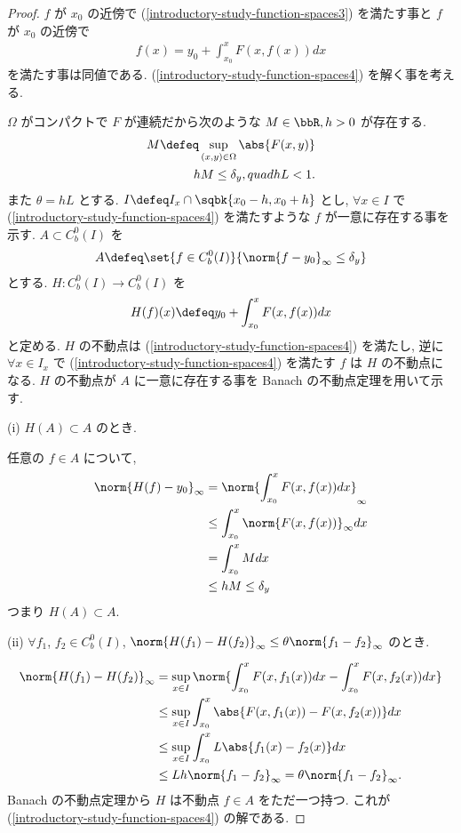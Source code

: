 \documentclass[openany, a4paper, oneside]{jsbook}
\begin{document}
\begin{proof}
$f$ が $x_0$ の近傍で (\ref{introductory-study-function-spaces3}) を満たす事と $f$ が $x_0$ の近傍で
\begin{align}
 f(x)
 =
 y_0 + \int_{x_0}^{x} F(x, f(x)) dx \label{introductory-study-function-spaces4}
\end{align}
を満たす事は同値である.
(\ref{introductory-study-function-spaces4}) を解く事を考える.

$\Omega$ がコンパクトで $F$ が連続だから次のような $M \in \bbR, h > 0$ が存在する.
\begin{align*}
 M
 \defeq
 \sup_{(x, y) \in \Omega} \abs{F(x, y)} \\
 hM
 \leq
 \delta_y, quad hL < 1.
\end{align*}
また $\theta=hL$ とする.
$I \defeq I_x \cap \sqbk{x_0 - h, x_0 + h}$ とし,
$\forall x \in I$ で (\ref{introductory-study-function-spaces4}) を満たすような $f$ が一意に存在する事を示す.
$A \subset C^0_b(I)$ を
\begin{align*}
 A
 \defeq
 \set{f \in C^0_b(I)}{\norm{f - y_0}_{\infty} \leq \delta_y}
\end{align*}
とする.
$H \colon C^0_b(I) \to C^0_b(I)$ を
\begin{align*}
 H(f)(x)
 \defeq
 y_0 + \int_{x_0}^{x} F(x, f(x)) dx
\end{align*}
と定める.
$H$ の不動点は (\ref{introductory-study-function-spaces4}) を満たし,
逆に $\forall x \in I_x$ で (\ref{introductory-study-function-spaces4}) を満たす $f$ は $H$ の不動点になる.
$H$ の不動点が $A$ に一意に存在する事を Banach の不動点定理を用いて示す.

(i) $H(A) \subset A$ のとき.

任意の $f\in A$ について,
\begin{align*}
 \norm{H(f) - y_0}_{\infty}
 &=
 \norm{\int_{x_0}^{x}F(x, f(x))dx}_{\infty} \\
 &\leq
 \int_{x_0}^{x} \norm{F(x, f(x))}_{\infty} dx \\
 &=
 \int_{x_0}^{x} M dx \\
 &\leq
 hM
 \leq
 \delta_y
\end{align*}
つまり  $H(A) \subset A$.

(ii) $\forall f_1$, $f_2 \in C^0_b(I)$, $\norm{H(f_1) - H(f_2)}_{\infty} \leq \theta \norm{f_1 - f_2}_{\infty}$ のとき.

\begin{align*}
 \norm{H(f_1) - H(f_2)}_{\infty}
 &=
 \sup_{x \in I} \norm{\int_{x_0}^{x} F(x, f_1(x)) dx - \int_{x_0}^{x} F(x, f_2(x)) dx} \\
 &\leq
 \sup_{x \in I} \int_{x_0}^{x} \abs{F(x, f_1(x)) - F(x, f_2(x))} dx \\
 &\leq
 \sup_{x \in I} \int_{x_0}^{x} L \abs{f_1(x) - f_2(x)} dx \\
 &\leq
 Lh \norm{f_1 - f_2}_{\infty}
 =
 \theta \norm{f_1 - f_2}_{\infty}.
\end{align*}
Banach の不動点定理から $H$ は不動点 $f \in A$ をただ一つ持つ.
これが (\ref{introductory-study-function-spaces4}) の解である.
\end{proof}
\end{document}
